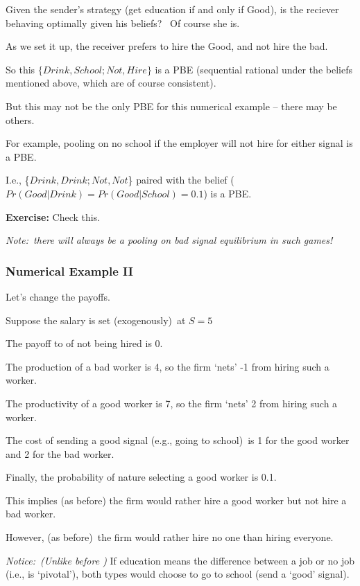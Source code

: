 \documentclass{article}
\begin{document}
\bigskip

Given the sender's strategy (get education if and only if Good), is the
reciever behaving optimally given his beliefs? \ Of course she is. \

As we set it up, the receiver prefers to hire the Good, and not hire the
bad. \

So this $\{Drink,School;Not,Hire\}$ is a PBE (sequential rational under the
beliefs mentioned above, which are of course consistent).

\bigskip

But this may not be the only PBE for this numerical example -- there may be
others. \

For example, pooling on no school if the employer will not hire for either
signal is a PBE.

I.e., \{$Drink,Drink;Not,Not$\} paired with the belief ($%
Pr(Good|Drink)=Pr(Good|School)=0.1$) is a PBE.

\textbf{Exercise: }Check this.

\bigskip

\textit{Note:\ there will always be a pooling on bad signal equilibrium in
such games!}\bigskip

\subsubsection{Numerical Example II}

Let's change the payoffs.

Suppose the salary is set (exogenously)\ at $S=5$

The payoff to of not being hired is $0.$

The production of a bad worker is 4, so the firm `nets' -1 from hiring such
a worker.

The productivity of a good worker is 7, so the firm `nets' 2 from hiring
such a worker.

The cost of sending a good signal (e.g., going to school)\ is 1 for the good
worker and 2 for the bad worker.

\bigskip

Finally, the probability of nature selecting a good worker is 0.1. \

This implies (as before) the firm would rather hire a good worker but not
hire a bad worker.

However, (as before)\ the firm would rather hire no one than hiring everyone.

\bigskip

\textit{Notice:\ (Unlike before ) }If education means the difference between
a job or no job (i.e., is `pivotal'), both types would choose to go to
school (send a `good' signal).
\end{document}
